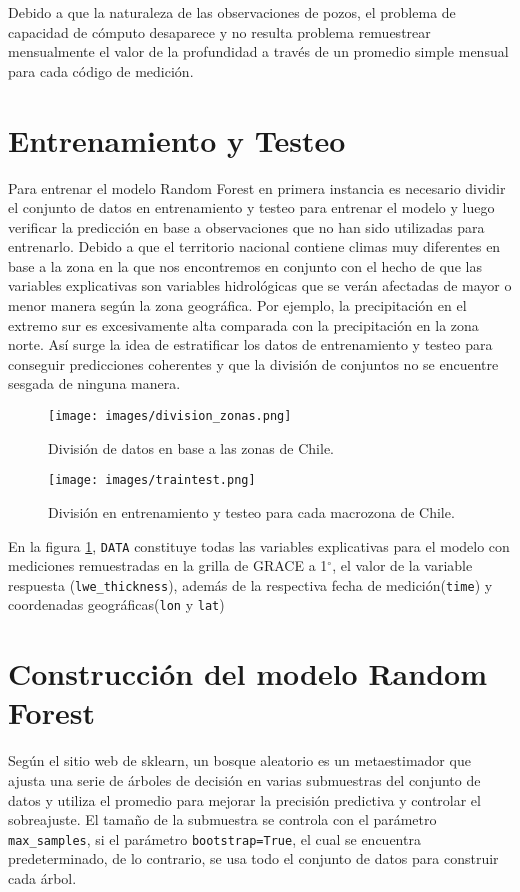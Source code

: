     Debido a que la naturaleza de las observaciones de pozos, el problema de capacidad de cómputo desaparece y no resulta problema remuestrear mensualmente el valor de la profundidad a través de 
    un promedio simple mensual para cada código de medición.
%   
%
%
%
%
%
%
\section{Entrenamiento y Testeo}
    Para entrenar el modelo Random Forest en primera instancia es necesario dividir el conjunto de datos en entrenamiento
    y testeo para entrenar el modelo y luego verificar la predicción en base a observaciones que no han sido utilizadas para 
    entrenarlo. Debido a que el territorio nacional contiene climas muy diferentes en base a la zona en la que nos encontremos
    en conjunto con el hecho de que las variables explicativas son variables hidrológicas que se verán afectadas de mayor o menor manera
    según la zona geográfica. Por ejemplo, la precipitación en el extremo sur es excesivamente alta comparada con la precipitación en 
    la zona norte. Así surge la idea de estratificar los datos de entrenamiento y testeo para conseguir predicciones coherentes 
    y que la división de conjuntos no se encuentre sesgada de ninguna manera.
    \begin{figure}[ht]
        \centering
              \texttt{[image: images/division\_zonas.png]}
              \vskip -0.1in
        \caption[División de datos por macrozonas de Chile]{\footnotesize División de datos en base a las zonas de Chile.}
        \label{division}
    \end{figure}

    \begin{figure}[ht]
        \centering
              \texttt{[image: images/traintest.png]}
              \vskip -0.1in
        \caption[Entrenamiento y testeo mediante macrozonas]{\footnotesize División en entrenamiento y testeo para cada macrozona de Chile.}
        \label{traintest}
    \end{figure}

    En la figura \ref{division}, \texttt{DATA} constituye todas las variables explicativas para el modelo con mediciones remuestradas en la grilla de GRACE
    a 1$^{\circ}$, el valor de la variable respuesta (\texttt{lwe\_thickness}), además de la respectiva fecha de medición(\texttt{time}) y 
    coordenadas geográficas(\texttt{lon} y \texttt{lat})
%
%
%
%
\section{Construcción del modelo Random Forest}
Según el sitio web de sklearn\cite{rfskl}, un bosque aleatorio es un metaestimador 
que ajusta una serie de árboles de decisión en varias submuestras 
del conjunto de datos y utiliza el promedio para mejorar la precisión predictiva y controlar el sobreajuste. 
El tamaño de la submuestra se controla con el parámetro \texttt{max\_samples}, si el parámetro \texttt{bootstrap=True}, el cual se encuentra predeterminado, 
de lo contrario, se usa todo el conjunto de datos para construir cada árbol.

